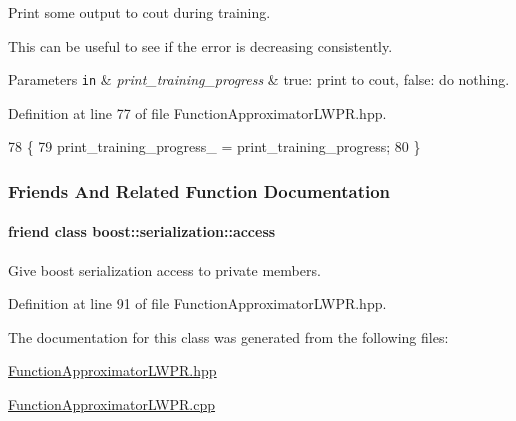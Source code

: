 Print some output to cout during training. 

This can be useful to see if the error is decreasing consistently. 
\begin{DoxyParams}[1]{Parameters}
\mbox{\tt in}  & {\em print\+\_\+training\+\_\+progress} & true\+: print to cout, false\+: do nothing. \\
\hline
\end{DoxyParams}


Definition at line 77 of file Function\+Approximator\+L\+W\+P\+R.\+hpp.


\begin{DoxyCode}
78   \{
79     print\_training\_progress\_ = print\_training\_progress;
80   \}
\end{DoxyCode}


\subsubsection{Friends And Related Function Documentation}
\hypertarget{classDmpBbo_1_1FunctionApproximatorLWPR_ac98d07dd8f7b70e16ccb9a01abf56b9c}{
\paragraph[{boost\+::serialization\+::access}]{\setlength{\rightskip}{0pt plus 5cm}friend class boost\+::serialization\+::access\hspace{0.3cm}{\ttfamily [friend]}}}\label{classDmpBbo_1_1FunctionApproximatorLWPR_ac98d07dd8f7b70e16ccb9a01abf56b9c}


Give boost serialization access to private members. 



Definition at line 91 of file Function\+Approximator\+L\+W\+P\+R.\+hpp.



The documentation for this class was generated from the following files\+:\begin{DoxyCompactItemize}
\item 
\hyperlink{FunctionApproximatorLWPR_8hpp}{Function\+Approximator\+L\+W\+P\+R.\+hpp}\item 
\hyperlink{FunctionApproximatorLWPR_8cpp}{Function\+Approximator\+L\+W\+P\+R.\+cpp}\end{DoxyCompactItemize}

